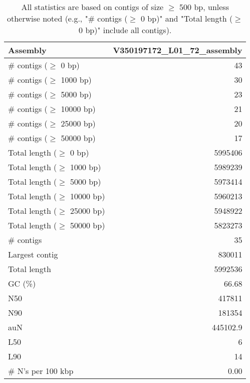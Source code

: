 \documentclass[12pt,a4paper]{article}
\begin{document}
\begin{table}[ht]
\begin{center}
\caption{All statistics are based on contigs of size $\geq$ 500 bp, unless otherwise noted (e.g., "\# contigs ($\geq$ 0 bp)" and "Total length ($\geq$ 0 bp)" include all contigs).}
\begin{tabular}{|l*{1}{|r}|}
\hline
Assembly & V350197172\_L01\_72\_assembly \\ \hline
\# contigs ($\geq$ 0 bp) & 43 \\ \hline
\# contigs ($\geq$ 1000 bp) & 30 \\ \hline
\# contigs ($\geq$ 5000 bp) & 23 \\ \hline
\# contigs ($\geq$ 10000 bp) & 21 \\ \hline
\# contigs ($\geq$ 25000 bp) & 20 \\ \hline
\# contigs ($\geq$ 50000 bp) & 17 \\ \hline
Total length ($\geq$ 0 bp) & 5995406 \\ \hline
Total length ($\geq$ 1000 bp) & 5989239 \\ \hline
Total length ($\geq$ 5000 bp) & 5973414 \\ \hline
Total length ($\geq$ 10000 bp) & 5960213 \\ \hline
Total length ($\geq$ 25000 bp) & 5948922 \\ \hline
Total length ($\geq$ 50000 bp) & 5823273 \\ \hline
\# contigs & 35 \\ \hline
Largest contig & 830011 \\ \hline
Total length & 5992536 \\ \hline
GC (\%) & 66.68 \\ \hline
N50 & 417811 \\ \hline
N90 & 181354 \\ \hline
auN & 445102.9 \\ \hline
L50 & 6 \\ \hline
L90 & 14 \\ \hline
\# N's per 100 kbp & 0.00 \\ \hline
\end{tabular}
\end{center}
\end{table}
\end{document}

